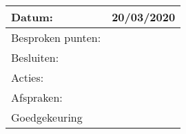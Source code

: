 \begin{tabularx}{\textwidth}{| l | X |}
  \hline
  Datum: & 20/03/2020\\
  \hline
  Besproken punten: & \\
  \hline
  Besluiten: & \\
  Acties: & \\
  Afspraken: & \\
  \hline
  Goedgekeuring & \\
  \hline
\end{tabularx}